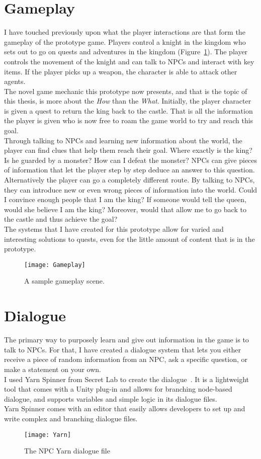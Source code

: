 \section{Gameplay}
I have touched previously upon what the player interactions are that form the gameplay of the prototype game. Players control a knight in the kingdom who sets out to go on quests and adventures in the kingdom (Figure~\ref{fig:gameplay}). The player controls the movement of the knight and can talk to NPCs and interact with key items. If the player picks up a weapon, the character is able to attack other agents.\\
The novel game mechanic this prototype now presents, and that is the topic of this thesis, is more about the \textit{How} than the \textit{What}. Initially, the player character is given a quest to return the king back to the castle. That is all the information the player is given who is now free to roam the game world to try and reach this goal.\\
Through talking to NPCs and learning new information about the world, the player can find clues that help them reach their goal. Where exactly is the king? Is he guarded by a monster? How can I defeat the monster? NPCs can give pieces of information that let the player step by step deduce an answer to this question.\\
Alternatively the player can go a completely different route. By talking to NPCs, they can introduce new or even wrong pieces of information into the world. Could I convince enough people that I am the king? If someone would tell the queen, would she believe I am the king? Moreover, would that allow me to go back to the castle and thus achieve the goal?\\
The systems that I have created for this prototype allow for varied and interesting solutions to quests, even for the little amount of content that is in the prototype.
\begin{figure}
	\centering
	\texttt{[image: Gameplay]}
	\caption{A sample gameplay scene.}
	\label{fig:gameplay}
\end{figure}
\section{Dialogue}
The primary way to purposely learn and give out information in the game is to talk to NPCs. For that, I have created a dialogue system that lets you either receive a piece of random information from an NPC, ask a specific question, or make a  statement on your own.\\
I used Yarn Spinner from Secret Lab to create the dialogue~\cite{Secret2021}. It is a lightweight tool that comes with a Unity plug-in and allows for branching node-based dialogue, and supports variables and simple logic in its dialogue files.\\
Yarn Spinner comes with an editor that easily allows developers to set up and write complex and branching dialogue files.
\begin{figure}
	\centering
	\texttt{[image: Yarn]}
	\caption{The NPC Yarn dialogue file}
	\label{fig:yarn}
\end{figure}
